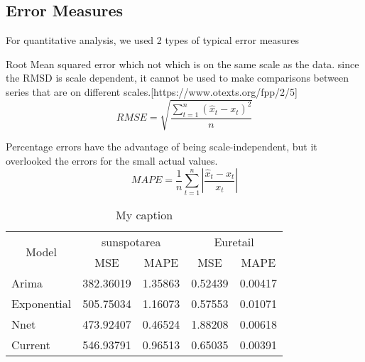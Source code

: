
\subsection{Error Measures}

For quantitative analysis, we used 2 types of  typical error measures 

Root Mean squared error which  not which is on the same scale as the data. since the RMSD is scale dependent, it cannot be used to make comparisons between series that are on different scales.[https://www.otexts.org/fpp/2/5]
$$RMSE=\sqrt{\frac{\sum_{t=1}^{n}(\hat{x}_{t}-x_{t})^{2}}{n}}$$


Percentage errors have the advantage of being scale-independent, but it overlooked the errors for the small actual values.
$$ MAPE=\frac{1}{n}\sum_{t=1}^{n}\left | \frac{\hat{x}_{t}-x_{t}}{x_{t}} \right |$$

\begin{table}[]
\centering
\caption{My caption}
\label{my-label}
\begin{tabular}{|l|r|r|r|r|}
\hline
\multicolumn{1}{|c|}{\multirow{2}{*}{Model}} & \multicolumn{2}{c|}{sunspotarea}                     & \multicolumn{2}{c|}{Euretail}                        \\ \cline{2-5} 
\multicolumn{1}{|c|}{}                       & \multicolumn{1}{c|}{MSE} & \multicolumn{1}{c|}{MAPE} & \multicolumn{1}{c|}{MSE} & \multicolumn{1}{c|}{MAPE} \\ \hline
Arima                                        & 382.36019                & 1.35863                   & 0.52439                  & 0.00417                   \\ \hline
Exponential                                  & 505.75034                & 1.16073                   & 0.57553                  & 0.01071                   \\ \hline
Nnet                                         & 473.92407                & 0.46524                   & 1.88208                  & 0.00618                   \\ \hline
Current                                      & 546.93791                & 0.96513                   & 0.65035                  & 0.00391                   \\ \hline
\end{tabular}
\end{table}

